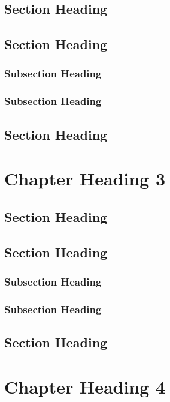\documentclass{aaltoseries}
\begin{document}
\section{Section Heading}
\lipsum[1-4]
\section{Section Heading}
\lipsum[5-6]
\subsection{Subsection Heading}
\lipsum[7-8]
\subsection{Subsection Heading}
\lipsum[9-10]
\section{Section Heading}
\lipsum[11-12]

\chapter[Alternative Chapter 3 Heading]{Chapter Heading 3}
\section{Section Heading}
\lipsum[1-4]
\section{Section Heading}
\lipsum[5-6]
\subsection{Subsection Heading}
\lipsum[7-8]
\subsection{Subsection Heading}
\lipsum[9-10]
\section{Section Heading}
\lipsum[11-12]


\chapter{Chapter Heading 4}
\end{document}
